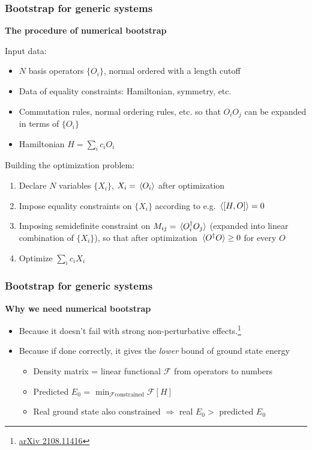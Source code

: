 \documentclass{beamer}
\begin{document}
\begin{frame}
\frametitle{Bootstrap for generic systems}

\textbf{The procedure of numerical bootstrap}   

Input data:
\begin{itemize}
    \item $N$ basis operators $\{O_i\}$, normal ordered with a length cutoff
    \item Data of equality constraints: Hamiltonian, symmetry, etc.
    \item Commutation rules, normal ordering rules, etc. so that $O_i O_j$ can be expanded in terms of $\{O_i\}$
    \item Hamiltonian $H = \sum_i c_i O_i$
\end{itemize}

Building the optimization problem:
\begin{enumerate}
    \item Declare $N$ variables $\{X_i\}$, $X_i = \expval*{O_i}$ after optimization
    \item Impose equality constraints on $\{X_i\}$ according to e.g. $\expval*{\comm{H}{O}} = 0$ 
    \item Imposing semidefinite constraint on $M_{ij} = \expval*{O_i^\dagger O_j}$ (expanded into linear combination of $\{X_i\}$), so that after optimization $\expval*{O^\dagger O} \geq 0$ for every $O$
    \item Optimize $\sum_i c_i X_i$
\end{enumerate}

\end{frame}

\begin{frame}
\frametitle{Bootstrap for generic systems}

\textbf{Why we need numerical bootstrap}

\begin{itemize}
    \item Because it doesn't fail with strong non-perturbative effects.\footnote{\href{https://arxiv.org/abs/2108.11416}{arXiv 2108.11416}}
    \item Because if done correctly, it gives the \emph{lower} bound of ground state energy
    \begin{itemize}
        \item Density matrix = linear functional $\mathcal{F}$ from operators to numbers
        \item Predicted $E_0$ = $\min_{\mathcal{F} \text{constrained}} \mathcal{F}[H]$
        \item Real ground state also constrained $\Rightarrow$ real $E_0 > $ predicted $E_0$
    \end{itemize}
\end{itemize}    

\end{frame}
\end{document}
